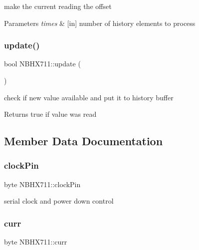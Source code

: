 make the current reading the offset 
\begin{DoxyParams}{Parameters}
{\em times} & \mbox{[}in\mbox{]} number of history elements to process \\
\hline
\end{DoxyParams}
\mbox{\label{class_n_b_h_x711_a30b9658963785c0dfd3ad490111d1180}} 
\subsubsection{\texorpdfstring{update()}{update()}}
{\footnotesize\ttfamily bool N\+B\+H\+X711\+::update (\begin{DoxyParamCaption}{ }\end{DoxyParamCaption})}

check if new value available and put it to history buffer \begin{DoxyReturn}{Returns}
true if value was read 
\end{DoxyReturn}


\subsection{Member Data Documentation}
\mbox{\label{class_n_b_h_x711_a1edd07d22e36984a252b4555a9d3ce0b}} 
\subsubsection{\texorpdfstring{clock\+Pin}{clockPin}}
{\footnotesize\ttfamily byte N\+B\+H\+X711\+::clock\+Pin\hspace{0.3cm}{\ttfamily [private]}}



serial clock and power down control 

\mbox{\label{class_n_b_h_x711_a6b89562f95840002b94a0ae8f8fb6530}} 
\subsubsection{\texorpdfstring{curr}{curr}}
{\footnotesize\ttfamily byte N\+B\+H\+X711\+::curr\hspace{0.3cm}{\ttfamily [protected]}}



